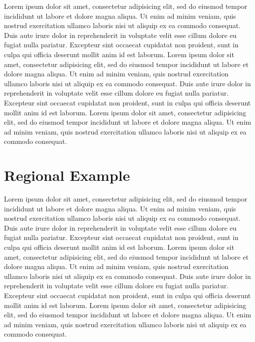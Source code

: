 \documentclass{bioinfo}
\begin{document}
\begin{methods}
Lorem ipsum dolor sit amet, consectetur adipisicing elit, sed do
eiusmod tempor incididunt ut labore et dolore magna aliqua. Ut enim ad
minim veniam, quis nostrud exercitation ullamco laboris nisi ut
aliquip ex ea commodo consequat. Duis aute irure dolor in
reprehenderit in voluptate velit esse cillum dolore eu fugiat nulla
pariatur. Excepteur sint occaecat cupidatat non proident, sunt in
culpa qui officia deserunt mollit anim id est laborum. Lorem ipsum
dolor sit amet, consectetur adipisicing elit, sed do eiusmod tempor
incididunt ut labore et dolore magna aliqua. Ut enim ad minim veniam,
quis nostrud exercitation ullamco laboris nisi ut aliquip ex ea
commodo consequat. Duis aute irure dolor in reprehenderit in voluptate
velit esse cillum dolore eu fugiat nulla pariatur. Excepteur sint
occaecat cupidatat non proident, sunt in culpa qui officia deserunt
mollit anim id est laborum. Lorem ipsum dolor sit amet, consectetur
adipisicing elit, sed do eiusmod tempor incididunt ut labore et dolore
magna aliqua. Ut enim ad minim veniam, quis nostrud exercitation
ullamco laboris nisi ut aliquip ex ea commodo consequat.

\end{methods}

\section{Regional Example}
Lorem ipsum dolor sit amet, consectetur adipisicing elit, sed do
eiusmod tempor incididunt ut labore et dolore magna aliqua. Ut enim ad
minim veniam, quis nostrud exercitation ullamco laboris nisi ut
aliquip ex ea commodo consequat. Duis aute irure dolor in
reprehenderit in voluptate velit esse cillum dolore eu fugiat nulla
pariatur. Excepteur sint occaecat cupidatat non proident, sunt in
culpa qui officia deserunt mollit anim id est laborum. Lorem ipsum
dolor sit amet, consectetur adipisicing elit, sed do eiusmod tempor
incididunt ut labore et dolore magna aliqua. Ut enim ad minim veniam,
quis nostrud exercitation ullamco laboris nisi ut aliquip ex ea
commodo consequat. Duis aute irure dolor in reprehenderit in voluptate
velit esse cillum dolore eu fugiat nulla pariatur. Excepteur sint
occaecat cupidatat non proident, sunt in culpa qui officia deserunt
mollit anim id est laborum. Lorem ipsum dolor sit amet, consectetur
adipisicing elit, sed do eiusmod tempor incididunt ut labore et dolore
magna aliqua. Ut enim ad minim veniam, quis nostrud exercitation
ullamco laboris nisi ut aliquip ex ea commodo consequat.
\end{document}
